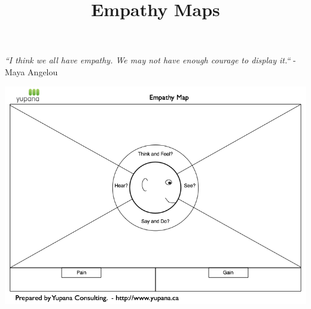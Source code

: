 \documentclass{ximera}
\title{Empathy Maps}
\begin{document}
\begin{abstract}

\end{abstract}
\maketitle

\emph{``I think we all have empathy. We may not have enough courage to display it.``} - Maya Angelou


\begin{image}
\includegraphics{Empathy-Map.png}
\end{image}
\end{document}
